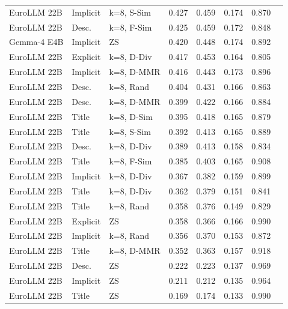\begin{longtable}{lllrrrrr}
EuroLLM 22B & Implicit & k=8, S-Sim & 0.427 & 0.459 & 0.174 & 0.870 \\
EuroLLM 22B & Desc. & k=8, F-Sim & 0.425 & 0.459 & 0.172 & 0.848 \\
Gemma-4 E4B & Implicit & ZS & 0.420 & 0.448 & 0.174 & 0.892 \\
EuroLLM 22B & Explicit & k=8, D-Div & 0.417 & 0.453 & 0.164 & 0.805 \\
EuroLLM 22B & Implicit & k=8, D-MMR & 0.416 & 0.443 & 0.173 & 0.896 \\
EuroLLM 22B & Desc. & k=8, Rand & 0.404 & 0.431 & 0.166 & 0.863 \\
EuroLLM 22B & Desc. & k=8, D-MMR & 0.399 & 0.422 & 0.166 & 0.884 \\
EuroLLM 22B & Title & k=8, D-Sim & 0.395 & 0.418 & 0.165 & 0.879 \\
EuroLLM 22B & Title & k=8, S-Sim & 0.392 & 0.413 & 0.165 & 0.889 \\
EuroLLM 22B & Desc. & k=8, D-Div & 0.389 & 0.413 & 0.158 & 0.834 \\
EuroLLM 22B & Title & k=8, F-Sim & 0.385 & 0.403 & 0.165 & 0.908 \\
EuroLLM 22B & Implicit & k=8, D-Div & 0.367 & 0.382 & 0.159 & 0.899 \\
EuroLLM 22B & Title & k=8, D-Div & 0.362 & 0.379 & 0.151 & 0.841 \\
EuroLLM 22B & Title & k=8, Rand & 0.358 & 0.376 & 0.149 & 0.829 \\
EuroLLM 22B & Explicit & ZS & 0.358 & 0.366 & 0.166 & 0.990 \\
EuroLLM 22B & Implicit & k=8, Rand & 0.356 & 0.370 & 0.153 & 0.872 \\
EuroLLM 22B & Title & k=8, D-MMR & 0.352 & 0.363 & 0.157 & 0.918 \\
EuroLLM 22B & Desc. & ZS & 0.222 & 0.223 & 0.137 & 0.969 \\
EuroLLM 22B & Implicit & ZS & 0.211 & 0.212 & 0.135 & 0.964 \\
EuroLLM 22B & Title & ZS & 0.169 & 0.174 & 0.133 & 0.990 \\
\end{longtable}